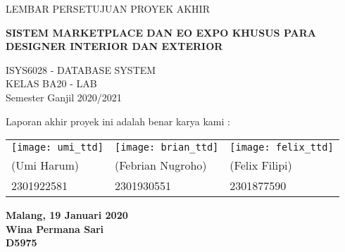 \thispagestyle{empty}
\begin{center}
	\Large
	LEMBAR PERSETUJUAN PROYEK AKHIR
	
	\vspace{0.8cm}
	\textbf{SISTEM MARKETPLACE DAN EO EXPO KHUSUS PARA DESIGNER INTERIOR DAN EXTERIOR}
	
	\vspace{0.8cm}
	ISYS6028 - DATABASE SYSTEM \\
	KELAS BA20 - LAB \\
	
	\vspace{0.5cm}
	Semester Ganjil 2020/2021
\end{center}

\vspace{1.0cm}
\begin{flushleft}
	\normalsize
	Laporan akhir proyek ini adalah benar karya kami :
\end{flushleft}
\begin{center}
\begin{tabular}{p{2.1in}p{2.1in}p{2.1in}}
	\texttt{[image: umi\_ttd]} & \texttt{[image: brian\_ttd]} & \texttt{[image: felix\_ttd]} \\
	(Umi Harum) & (Febrian Nugroho) & (Felix Filipi)\\
	2301922581 & 2301930551 & 2301877590\\
\end{tabular}
\end{center}
\begin{flushright}
	\vfill
	\textbf{Malang, 19 Januari 2020}\\
	\vspace{2cm}
	\textbf{Wina Permana Sari} \\
	\textbf{D5975}
\end{flushright}
